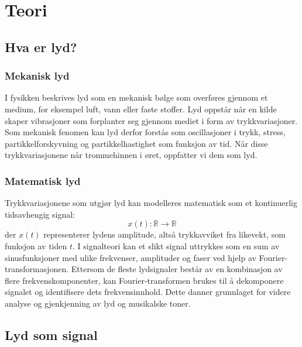 \section{Teori}

\subsection{Hva er lyd?}

\subsubsection{Mekanisk lyd}
I fysikken beskrives lyd som en mekanisk bølge som overføres gjennom et medium, for eksempel luft, vann eller faste stoffer. 
Lyd oppstår når en kilde skaper vibrasjoner som forplanter seg gjennom mediet i form av trykkvariasjoner. 
Som mekanisk fenomen kan lyd derfor forstås som oscillasjoner i trykk, stress, partikkelforskyvning og partikkelhastighet som funksjon av tid. 
Når disse trykkvariasjonene når trommehinnen i øret, oppfatter vi dem som lyd.

\subsubsection{Matematisk lyd}
Trykkvariasjonene som utgjør lyd kan modelleres matematisk som et kontinuerlig tidsavhengig signal:
\[
x(t): \mathbb{R} \rightarrow \mathbb{R}
\]
der $x(t)$ representerer lydens amplitude, altså trykkavviket fra likevekt, som funksjon av tiden $t$. 
I signalteori kan et slikt signal uttrykkes som en sum av sinusfunksjoner med ulike frekvenser, amplituder og faser ved hjelp av Fourier-transformasjonen. 
Ettersom de fleste lydsignaler består av en kombinasjon av flere frekvenskomponenter, kan Fourier-transformen brukes til å dekomponere signalet og identifisere dets frekvensinnhold. 
Dette danner grunnlaget for videre analyse og gjenkjenning av lyd og musikalske toner.

\subsection{Lyd som signal}
